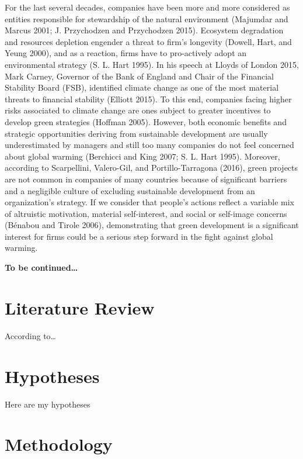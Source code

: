 \documentclass[12pt,]{article}
\begin{document}
For the last several decades, companies have been more and more
considered as entities responsible for stewardship of the natural
environment (Majumdar and Marcus 2001; J. Przychodzen and Przychodzen
2015). Ecosystem degradation and resources depletion engender a threat
to firm's longevity (Dowell, Hart, and Yeung 2000), and as a reaction,
firms have to pro-actively adopt an environmental strategy (S. L. Hart
1995). In his speech at Lloyds of London 2015, Mark Carney, Governor of
the Bank of England and Chair of the Financial Stability Board (FSB),
identified climate change as one of the most material threats to
financial stability (Elliott 2015). To this end, companies facing higher
risks associated to climate change are ones subject to greater
incentives to develop green strategies (Hoffman 2005). However, both
economic benefits and strategic opportunities deriving from sustainable
development are usually underestimated by managers and still too many
companies do not feel concerned about global warming (Berchicci and King
2007; S. L. Hart 1995). Moreover, according to Scarpellini, Valero-Gil,
and Portillo-Tarragona (2016), green projects are not common in
companies of many countries because of significant barriers and a
negligible culture of excluding sustainable development from an
organization's strategy. If we consider that people's actions reflect a
variable mix of altruistic motivation, material self-interest, and
social or self-image concerns (Bénabou and Tirole 2006), demonstrating
that green development is a significant interest for firms could be a
serious step forward in the fight against global warming.

\textbf{To be continued\ldots{}}

\FloatBarrier
\newpage

\section{Literature Review}\label{literature-review}

According to\ldots{}

\FloatBarrier
\newpage

\section{Hypotheses}\label{hypotheses}

Here are my hypotheses

\FloatBarrier
\newpage

\section{Methodology}\label{methodology}
\end{document}
